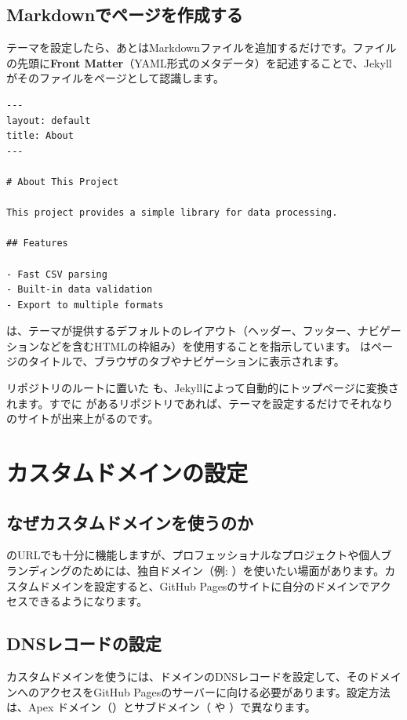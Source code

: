 \subsection{Markdownでページを作成する}

テーマを設定したら、あとはMarkdownファイルを追加するだけです。ファイルの先頭に\textbf{Front Matter}（YAML形式のメタデータ）を記述することで、Jekyllがそのファイルをページとして認識します。

\begin{lstlisting}[language={}]
---
layout: default
title: About
---

# About This Project

This project provides a simple library for data processing.

## Features

- Fast CSV parsing
- Built-in data validation
- Export to multiple formats
\end{lstlisting}

 は、テーマが提供するデフォルトのレイアウト（ヘッダー、フッター、ナビゲーションなどを含むHTMLの枠組み）を使用することを指示しています。 はページのタイトルで、ブラウザのタブやナビゲーションに表示されます。

リポジトリのルートに置いた  も、Jekyllによって自動的にトップページに変換されます。すでに  があるリポジトリであれば、テーマを設定するだけでそれなりのサイトが出来上がるのです。

\section{カスタムドメインの設定}

\subsection{なぜカスタムドメインを使うのか}

 のURLでも十分に機能しますが、プロフェッショナルなプロジェクトや個人ブランディングのためには、独自ドメイン（例: ）を使いたい場面があります。カスタムドメインを設定すると、GitHub Pagesのサイトに自分のドメインでアクセスできるようになります。

\subsection{DNSレコードの設定}

カスタムドメインを使うには、ドメインのDNSレコードを設定して、そのドメインへのアクセスをGitHub Pagesのサーバーに向ける必要があります。設定方法は、Apex ドメイン（）とサブドメイン（ や ）で異なります。

